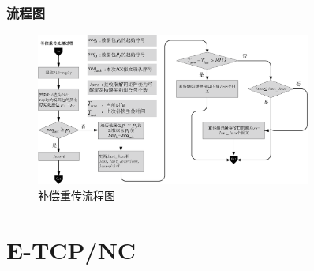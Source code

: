 \begin{frame}
	\frametitle{流程图}
	\begin{figure}
		\hspace{-1.5em}
		\includegraphics[height=5cm]{../figures/bccc.eps}
		\caption{补偿重传流程图}
		\label{fig:buchang}
	\end{figure}
\end{frame}

\section{E-TCP/NC}